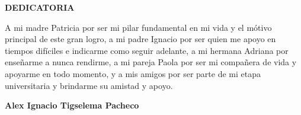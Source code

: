 \newpage
\vspace*{\fill}
\begin{flushright}
  \footnotesize
	\begin{minipage}{0.5\textwidth}
		\begin{flushright}
			\uppercase{\textbf{Dedicatoria}}
		\end{flushright}
		\itshape

		A mi madre Patricia por ser mi pilar fundamental en mi vida y el mótivo principal de este gran logro,
		a mi padre Ignacio por ser quien me apoyo en tiempos difíciles e indicarme como seguir adelante,
		a mi hermana Adriana por enseñarme a nunca rendirme,
		a mi pareja Paola por ser mi compañera de vida y apoyarme en todo momento,
		y a mis amigos por ser parte de mi etapa universitaria y brindarme su amistad y apoyo.

		\bigbreak
		\begin{flushright}
			\textbf{Alex Ignacio Tigselema Pacheco}
		\end{flushright}
	\end{minipage}
\end{flushright}
\vspace*{\fill}
